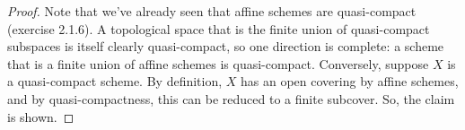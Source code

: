 \begin{proof}
	Note that we've already seen that affine schemes are quasi-compact (exercise 2.1.6). A topological space that is the finite union of quasi-compact subspaces is itself clearly quasi-compact, so one direction is complete: a scheme that is a finite union of affine schemes is quasi-compact. Conversely, suppose $X$ is a quasi-compact scheme. By definition, $X$ has an open covering by affine schemes, and by quasi-compactness, this can be reduced to a finite subcover. So, the claim is shown.
\end{proof}
